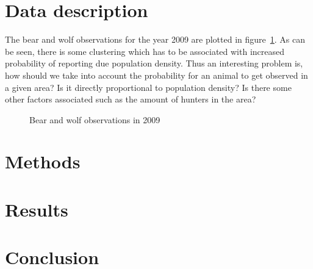 \documentclass[12pt,a4paper,oneside,article]{memoir}
\author{Ville Väänänen}
\begin{document}
\mytitlepage

\section{Data description}

The bear and wolf observations for the year 2009 are plotted in figure~\ref{fig:bw_2009}.
As can be seen, there is some clustering which has to be associated with increased
probability of reporting due population density. Thus an interesting problem is,
how should we take into account the probability for an animal to get observed
in a given area? Is it directly proportional to population density? Is there some
other factors associated such as the amount of hunters in the area?

\begin{figure}[htbp]
  \begin{adjustwidth}{-2in}{-2in}
	  \centering
  \end{adjustwidth}
  \caption{Bear and wolf observations in 2009}
  \label{fig:bw_2009}
\end{figure}

\section{Methods}

\section{Results}

\section{Conclusion}
\end{document}
